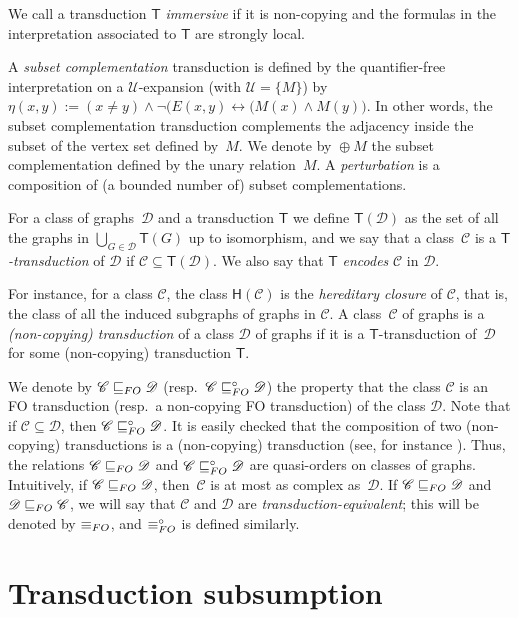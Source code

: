 \documentclass{lmcs}
\newcommand{\Cc}{\mathscr{C}}
\newcommand{\Dd}{\mathscr{D}}
\renewcommand{\FO}{{\rm FO}}
\theoremstyle{definition}
\DeclareMathOperator{\comp}{\oplus}
\begin{document}
We call a transduction $\mathsf T$ {\em immersive} if it is
non-copying and the formulas in the interpretation associated to
$\mathsf T$ are strongly local.

A {\em subset complementation} transduction is defined by the
quantifier-free interpretation on a ${\mathcal U}$-expansion (with
${\mathcal U}=\{M\}$) by
$\eta(x,y):=(x\neq y)\wedge \neg \bigl(E(x,y)\leftrightarrow(M(x)\wedge M(y)\bigr)$.
In other words, the subset complementation transduction complements
the adjacency inside the subset of the vertex set defined by~$M$. We
denote by $\comp M$ the subset complementation defined by the unary
relation~$M$. A {\em perturbation} is a composition of (a bounded
number of) subset complementations.


For a class of graphs~$\Dd$ and a transduction $\mathsf T$ we define $\mathsf T(\Dd)$ as the set of all the graphs in 
$\bigcup_{G\in\Dd}\mathsf T(G)$ up to isomorphism, and 
we say that a class~$\Cc$ is a  {\em $\mathsf T$-transduction} of $\Dd$ if $\Cc\subseteq\mathsf T(\Dd)$. 
We also say that $\mathsf{T}$ \emph{encodes} $\Cc$ in $\Dd$. 


For instance, for a class $\Cc$, the class $\mathsf H(\Cc)$ is the \emph{hereditary closure} of $\Cc$, that is, the class of all the induced subgraphs of graphs in $\Cc$.
A class~$\Cc$ of graphs is a \emph{(non-copying) transduction} of a class $\Dd$ of
graphs if it is a $\mathsf T$-transduction of~$\Dd$ for some (non-copying) transduction $\mathsf T$.

We denote by $\Cc\sqsubseteq_\FO\Dd$ (resp.\ $\Cc\sqsubseteq^{\circ}_\FO\Dd$) the property that the class $\Cc$ is an FO transduction (resp.\ a non-copying FO transduction) of the class $\Dd$. Note that if $\Cc\subseteq \Dd$, then $\Cc\sqsubseteq_\FO^{\circ} \Dd$. 
It is easily checked that the composition of two (non-copying) transductions is a (non-copying) transduction (see, for instance \cite[Theorem 7.14]{courcelle2012graph}). Thus, the relations
$\Cc\sqsubseteq_\FO\Dd$ and 
$\Cc\sqsubseteq^{\circ}_\FO\Dd$ are quasi-orders
on classes of graphs.
Intuitively, if $\Cc\sqsubseteq_\FO \Dd$, then~$\Cc$ is at most as complex as~$\Dd$.
If $\Cc\sqsubseteq_\FO \Dd$ and $\Dd\sqsubseteq_\FO \Cc$, we will say that $\Cc$ and $\Dd$ are {\em transduction-equivalent}; this will be denoted by $\equiv_\FO$, and $\equiv_\FO^\circ$ is defined similarly.

\section{Transduction subsumption} \label{sec:subsump}
\end{document}
